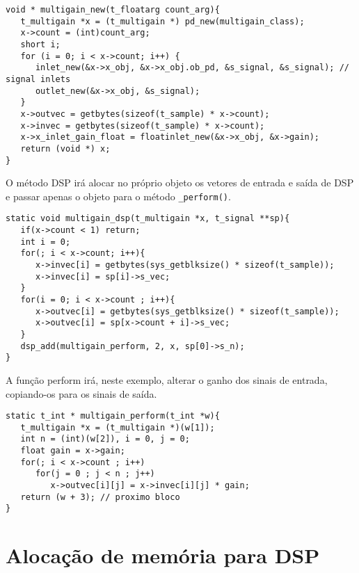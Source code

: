 \begin{lstlisting}[caption=Estrutura do construtor para iolets DSP dinâmicos]
void * multigain_new(t_floatarg count_arg){
   t_multigain *x = (t_multigain *) pd_new(multigain_class);
   x->count = (int)count_arg;
   short i;
   for (i = 0; i < x->count; i++) {
      inlet_new(&x->x_obj, &x->x_obj.ob_pd, &s_signal, &s_signal); // signal inlets
      outlet_new(&x->x_obj, &s_signal);
   }
   x->outvec = getbytes(sizeof(t_sample) * x->count);
   x->invec = getbytes(sizeof(t_sample) * x->count);
   x->x_inlet_gain_float = floatinlet_new(&x->x_obj, &x->gain);
   return (void *) x;
}
\end{lstlisting}

O método DSP irá alocar no próprio objeto os vetores de entrada e saída de DSP e
passar apenas o objeto para o método \texttt{\_perform()}.

\begin{lstlisting}[caption=Método DSP para iolets DSP dinâmicos]
static void multigain_dsp(t_multigain *x, t_signal **sp){
   if(x->count < 1) return;
   int i = 0;
   for(; i < x->count; i++){
      x->invec[i] = getbytes(sys_getblksize() * sizeof(t_sample));
      x->invec[i] = sp[i]->s_vec;
   }
   for(i = 0; i < x->count ; i++){
      x->outvec[i] = getbytes(sys_getblksize() * sizeof(t_sample));
      x->outvec[i] = sp[x->count + i]->s_vec;
   }
   dsp_add(multigain_perform, 2, x, sp[0]->s_n);
}
\end{lstlisting}

A função perform irá, neste exemplo, alterar o ganho dos sinais de entrada,
copiando-os para os sinais de saída.

\begin{lstlisting}[caption=Método Perform para iolets DSP dinâmicos]
static t_int * multigain_perform(t_int *w){
   t_multigain *x = (t_multigain *)(w[1]);
   int n = (int)(w[2]), i = 0, j = 0;
   float gain = x->gain;
   for(; i < x->count ; i++)
      for(j = 0 ; j < n ; j++)
         x->outvec[i][j] = x->invec[i][j] * gain;
   return (w + 3); // proximo bloco
}
\end{lstlisting}

\section{Alocação de memória para DSP}

